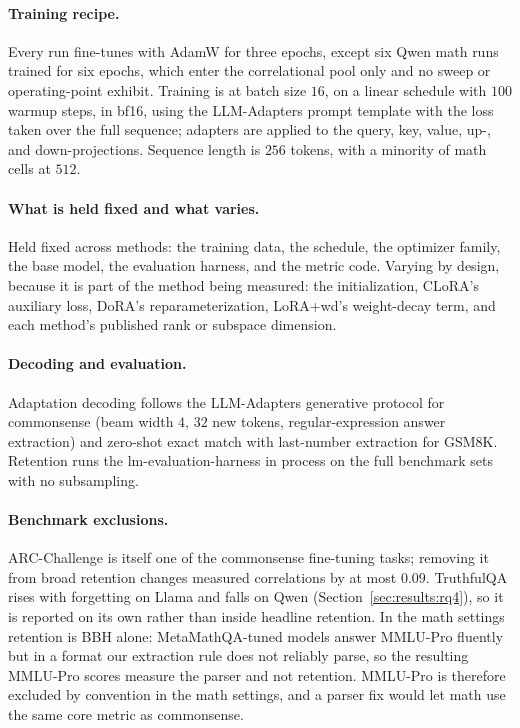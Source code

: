 \documentclass[11pt]{article}
\begin{document}
\paragraph{Training recipe.} Every run fine-tunes with AdamW for three epochs,
except six Qwen math runs trained for six epochs, which enter the correlational
pool only and no sweep or operating-point exhibit. Training is
at batch size $16$, on a linear schedule with $100$ warmup steps, in bf16,
using the LLM-Adapters prompt template with the loss taken over the full
sequence; adapters are applied to the query, key, value, up-, and
down-projections. Sequence length is $256$ tokens, with a minority of math
cells at $512$.

\paragraph{What is held fixed and what varies.} Held fixed across methods:
the training data, the schedule, the optimizer family, the base model, the
evaluation harness, and the metric code. Varying by design, because it is part
of the method being measured: the initialization, CLoRA's auxiliary loss,
DoRA's reparameterization, LoRA{+}wd's weight-decay term, and each method's
published rank or subspace dimension.

\paragraph{Decoding and evaluation.} Adaptation decoding follows the
LLM-Adapters generative protocol for commonsense (beam width $4$, $32$ new
tokens, regular-expression answer extraction) and zero-shot exact match with
last-number extraction for GSM8K. Retention runs the lm-evaluation-harness in
process on the full benchmark sets with no subsampling.

\paragraph{Benchmark exclusions.} ARC-Challenge is itself one of the
commonsense fine-tuning tasks; removing it from broad retention changes
measured correlations by at most $0.09$. TruthfulQA rises with forgetting on
Llama and falls on Qwen (Section~\ref{sec:results:rq4}), so it is reported on
its own rather than inside headline retention. In the math settings retention
is BBH alone: MetaMathQA-tuned models answer MMLU-Pro fluently but in a format
our extraction rule does not reliably parse, so the resulting MMLU-Pro scores
measure the parser and not retention. MMLU-Pro is therefore excluded by
convention in the math settings, and a parser fix would let math use the same
core metric as commonsense.
\end{document}
